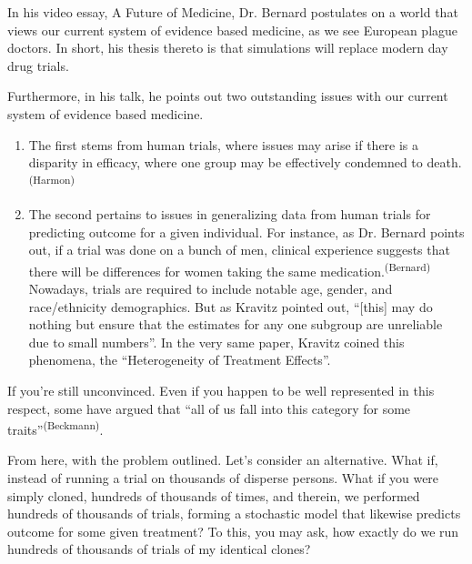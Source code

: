 
In his video essay, A Future of Medicine, Dr. Bernard postulates on a world that views our current system of evidence based medicine, as we see European plague doctors. In short, his thesis thereto is that simulations will replace modern day drug trials. 

Furthermore, in his talk, he points out two outstanding issues with our current system of evidence based medicine.

\begin{enumerate}
    \item The first stems from human trials, where issues may arise if there is a disparity in efficacy, where one group may be effectively condemned to death.\textsuperscript{(Harmon)}
    \item The second pertains to issues in generalizing data from human trials for predicting outcome for a given individual. For instance, as Dr. Bernard points out, if a trial was done on a bunch of men, clinical experience suggests that there will be differences for women taking the same medication.\textsuperscript{(Bernard)} Nowadays, trials are required to include notable age, gender, and race/ethnicity demographics. But as Kravitz pointed out, ``[this] may do nothing but ensure that the estimates for any one subgroup are unreliable due to small numbers''. In the very same paper, Kravitz coined this phenomena, the ``Heterogeneity of Treatment Effects''. 
\end{enumerate}

If you're still unconvinced. Even if you happen to be well represented in this respect, some have argued that ``all of us fall into this category for some traits''\textsuperscript{(Beckmann)}. 

From here, with the problem outlined. Let's consider an alternative. What if, instead of running a trial on thousands of disperse persons. What if you were simply cloned, hundreds of thousands of times, and therein, we performed hundreds of thousands of trials, forming a stochastic model that likewise predicts outcome for some given treatment? To this, you may ask, how exactly do we run hundreds of thousands of trials of my identical clones?

